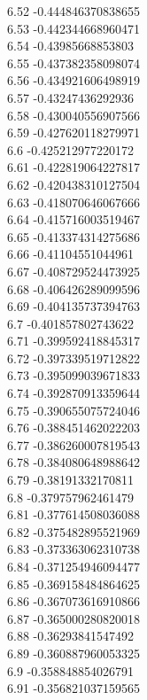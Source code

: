 {6.52	-0.444846370838655\\
6.53	-0.442344668960471\\
6.54	-0.43985668853803\\
6.55	-0.437382358098074\\
6.56	-0.434921606498919\\
6.57	-0.43247436292936\\
6.58	-0.430040556907566\\
6.59	-0.427620118279971\\
6.6	-0.425212977220172\\
6.61	-0.422819064227817\\
6.62	-0.420438310127504\\
6.63	-0.418070646067666\\
6.64	-0.415716003519467\\
6.65	-0.413374314275686\\
6.66	-0.41104551044961\\
6.67	-0.408729524473925\\
6.68	-0.406426289099596\\
6.69	-0.404135737394763\\
6.7	-0.401857802743622\\
6.71	-0.399592418845317\\
6.72	-0.397339519712822\\
6.73	-0.395099039671833\\
6.74	-0.392870913359644\\
6.75	-0.390655075724046\\
6.76	-0.388451462022203\\
6.77	-0.386260007819543\\
6.78	-0.384080648988642\\
6.79	-0.38191332170811\\
6.8	-0.379757962461479\\
6.81	-0.377614508036088\\
6.82	-0.375482895521969\\
6.83	-0.373363062310738\\
6.84	-0.371254946094477\\
6.85	-0.369158484864625\\
6.86	-0.367073616910866\\
6.87	-0.365000280820018\\
6.88	-0.36293841547492\\
6.89	-0.360887960053325\\
6.9	-0.358848854026791\\
6.91	-0.356821037159565\\
}
